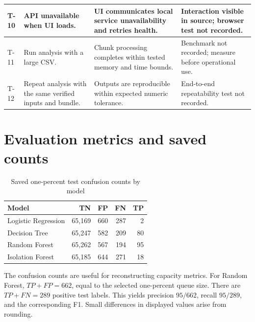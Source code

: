 \documentclass[12pt,a4paper,oneside]{report}
\newcommand{\tablefont}{\small}
\begin{document}
\begin{longtable}{|p{}|p{}|p{}|p{}|}
T-10 & API unavailable when UI loads. & UI communicates local service unavailability and retries health. & Interaction visible in source; browser test not recorded.\\\hline
T-11 & Run analysis with a large CSV. & Chunk processing completes within tested memory and time bounds. & Benchmark not recorded; measure before operational use.\\\hline
T-12 & Repeat analysis with the same verified inputs and bundle. & Outputs are reproducible within expected numeric tolerance. & End-to-end repeatability test not recorded.\\\hline
\end{longtable}

\section{Evaluation metrics and saved counts}
\label{app:metrics}
\begin{table}[H]
\centering
\tablefont
\caption{Saved one-percent test confusion counts by model}
\label{tab:all-confusion}
\begin{tabularx}{\textwidth}{|p{}|R|R|R|R|}
\hline
\textbf{Model} & \textbf{TN} & \textbf{FP} & \textbf{FN} & \textbf{TP}\\\hline
Logistic Regression & 65,169 & 660 & 287 & 2\\\hline
Decision Tree & 65,247 & 582 & 209 & 80\\\hline
Random Forest & 65,262 & 567 & 194 & 95\\\hline
Isolation Forest & 65,185 & 644 & 271 & 18\\\hline
\end{tabularx}
\end{table}

The confusion counts are useful for reconstructing capacity metrics.
For Random Forest, \(TP+FP=662\), equal to the selected one-percent
queue size. There are \(TP+FN=289\) positive test labels. This yields
precision \(95/662\), recall \(95/289\), and the corresponding F1.
Small differences in displayed values arise from rounding.
\end{document}
